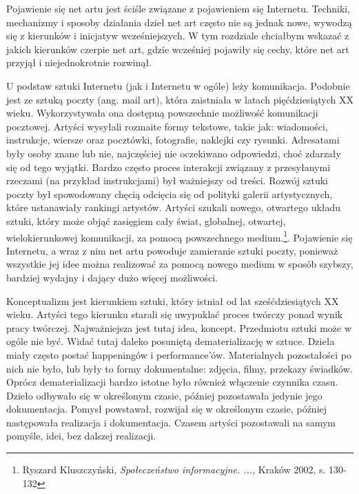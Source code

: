 \documentclass[a4paper,12pt,twoside]{article}
\begin{document}
Pojawienie się net artu jest ściśle związane z pojawieniem się Internetu.
Techniki, mechanizmy i sposoby działania dzieł net art często nie są
jednak nowe, wywodzą się z kierunków i inicjatyw wcześniejszych.
W tym rozdziale chciałbym wskazać z jakich kierunków czerpie net art,
gdzie wcześniej pojawiły się cechy, które net art przyjął i niejednokrotnie
rozwinął.

U podstaw sztuki Internetu (jak i Internetu w ogóle) leży komunikacja.
Podobnie jest ze sztuką poczty (ang. mail art), która zaistniała w latach
pięćdziesiątych XX wieku. Wykorzystywała ona dostępną powszechnie możliwość
komunikacji pocztowej. Artyści wysyłali rozmaite formy tekstowe, takie jak:
wiadomości, instrukcje, wiersze oraz pocztówki, fotografie, naklejki czy
rysunki. Adresatami były osoby znane lub nie, najczęściej nie oczekiwano
odpowiedzi, choć zdarzały się od tego wyjątki. Bardzo często proces
interakcji związany z przesyłanymi rzeczami (na przykład instrukcjami)
był ważniejszy od treści. Rozwój sztuki poczty był
spowodowany chęcią odcięcia się od polityki galerii artystycznych, które
ustanawiały rankingi artystów. Artyści szukali nowego, otwartego układu
sztuki, który może objąć zasięgiem cały świat, globalnej, otwartej,
wielokierunkowej komunikacji, za pomocą powszechnego
medium.\footnote{Ryszard Kluszczyński,
\textit{Społeczeństwo informacyjne. ...}, Kraków 2002, s. 130-132}.
Pojawienie się Internetu, a wraz z nim net artu powoduje zamieranie sztuki
poczty, ponieważ wszystkie jej idee można realizować za pomocą nowego medium
w sposób szybszy, bardziej wydajny i dający dużo więcej możliwości.

Konceptualizm jest kierunkiem sztuki, który istniał od lat sześćdziesiątych
XX wieku. Artyści tego kierunku starali się uwypuklać proces twórczy
ponad wynik pracy twórczej. Najważniejsza jest tutaj idea, koncept.
Przedmiotu sztuki może w ogóle nie być. Widać tutaj daleko posuniętą
dematerializację w sztuce. Dzieła miały często postać happeningów
i performance'ów. Materialnych pozostałości po nich nie było, lub były
to formy dokumentalne: zdjęcia, filmy, przekazy świadków. Oprócz
dematerializacji bardzo istotne było również włączenie
czynnika czasu. Dzieło odbywało się w określonym czasie, później pozostawała
jedynie jego dokumentacja. Pomysł powstawał, rozwijał się w określonym czasie,
później następowała realizacja i dokumentacja. Czasem artyści pozostawali
na samym pomyśle, idei, bez dalszej realizacji.
\end{document}
